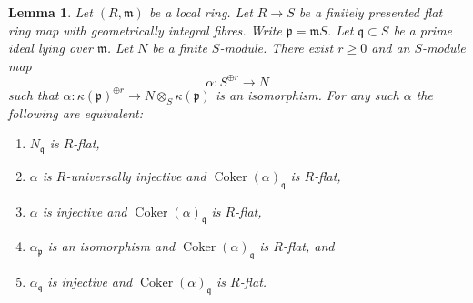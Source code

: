 \documentclass{amsart}
\theoremstyle{plain}
\newtheorem{lemma}[subsection]{Lemma}
\theoremstyle{definition}
\theoremstyle{remark}
\numberwithin{equation}{subsection}
\def\Coker{\mathop{\mathrm{Coker}}}
\begin{document}
\begin{lemma}
\label{lemma-induction-step}
Let $(R, \mathfrak m)$ be a local ring. Let $R \to S$ be a finitely presented
flat ring map with geometrically integral fibres. Write
$\mathfrak p = \mathfrak mS$. Let $\mathfrak q \subset S$ be a prime ideal
lying over $\mathfrak m$. Let $N$ be a finite $S$-module.
There exist $r \geq 0$ and an $S$-module map
$$
\alpha : S^{\oplus r} \longrightarrow N
$$
such that
$\alpha : \kappa(\mathfrak p)^{\oplus r} \to N \otimes_S \kappa(\mathfrak p)$
is an isomorphism. For any such $\alpha$ the following are equivalent:
\begin{enumerate}
\item $N_{\mathfrak q}$ is $R$-flat,
\item $\alpha$ is $R$-universally injective and
$\Coker(\alpha)_{\mathfrak q}$ is $R$-flat,
\item $\alpha$ is injective and
$\Coker(\alpha)_{\mathfrak q}$ is $R$-flat,
\item $\alpha_{\mathfrak p}$ is an isomorphism and
$\Coker(\alpha)_{\mathfrak q}$ is $R$-flat, and
\item $\alpha_{\mathfrak q}$ is injective and
$\Coker(\alpha)_{\mathfrak q}$ is $R$-flat.
\end{enumerate}
\end{lemma}
\end{document}
